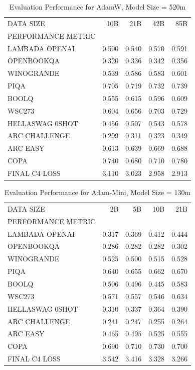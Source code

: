 \begin{table}
[H] \centering \caption{Evaluation Performance for AdamW, Model Size = 520m}
\label{tab:eval-performance-adamw-520M}
\begin{tabular}{lrrrr}
\toprule
DATA SIZE & 10B & 21B & 42B & 85B \\
PERFORMANCE METRIC &  &  &  &  \\
\midrule
LAMBADA OPENAI & 0.500 & 0.540 & 0.570 & 0.591 \\
OPENBOOKQA & 0.320 & 0.336 & 0.342 & 0.356 \\
WINOGRANDE & 0.539 & 0.586 & 0.583 & 0.601 \\
PIQA & 0.705 & 0.719 & 0.732 & 0.739 \\
BOOLQ & 0.555 & 0.615 & 0.596 & 0.609 \\
WSC273 & 0.604 & 0.656 & 0.703 & 0.729 \\
HELLASWAG 0SHOT & 0.456 & 0.507 & 0.543 & 0.578 \\
ARC CHALLENGE & 0.299 & 0.311 & 0.323 & 0.349 \\
ARC EASY & 0.613 & 0.639 & 0.669 & 0.688 \\
COPA & 0.740 & 0.680 & 0.710 & 0.780 \\
FINAL C4 LOSS & 3.110 & 3.023 & 2.958 & 2.913 \\
\bottomrule
\end{tabular}
\end{table}


\begin{table}
[H] \centering \caption{Evaluation Performance for Adam-Mini, Model Size = 130m}
\label{tab:eval-performance-adam-mini-130M}
\begin{tabular}{lrrrr}
\toprule
DATA SIZE & 2B & 5B & 10B & 21B \\
PERFORMANCE METRIC &  &  &  &  \\
\midrule
LAMBADA OPENAI & 0.317 & 0.369 & 0.412 & 0.444 \\
OPENBOOKQA & 0.286 & 0.282 & 0.282 & 0.302 \\
WINOGRANDE & 0.525 & 0.500 & 0.515 & 0.528 \\
PIQA & 0.640 & 0.655 & 0.662 & 0.670 \\
BOOLQ & 0.506 & 0.496 & 0.445 & 0.583 \\
WSC273 & 0.571 & 0.557 & 0.546 & 0.634 \\
HELLASWAG 0SHOT & 0.310 & 0.337 & 0.364 & 0.390 \\
ARC CHALLENGE & 0.241 & 0.247 & 0.255 & 0.264 \\
ARC EASY & 0.465 & 0.495 & 0.525 & 0.555 \\
COPA & 0.690 & 0.710 & 0.730 & 0.700 \\
FINAL C4 LOSS & 3.542 & 3.416 & 3.328 & 3.266 \\
\bottomrule
\end{tabular}
\end{table}


